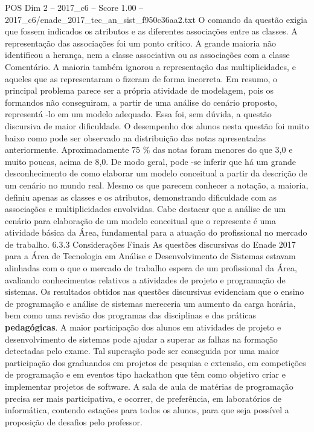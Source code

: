 \begin{textsample}{POS Dim 2 – 2017\_c6 – Score 1.00 – 2017\_c6/enade\_2017\_tec\_an\_sist\_f950c36aa2.txt}
O comando da questão exigia que fossem indicados os atributos e as diferentes associações entre as classes.
A representação das associações foi um ponto crítico.
A grande maioria não identificou a herança, nem a classe associativa ou as associações com a classe Comentário.
A maioria também ignorou a representação das multiplicidades, e aqueles que as representaram o fizeram de forma incorreta.
Em resumo, o principal problema parece ser a própria atividade de modelagem, pois os formandos não conseguiram, a partir de uma análise do cenário proposto, representá -lo em um modelo adequado.
Essa foi, sem dúvida, a questão discursiva de maior dificuldade.
O desempenho dos alunos nesta questão foi muito baixo como pode ser observado na distribuição das notas apresentadas anteriormente.
Aproximadamente 75 \% das notas foram menores do que 3,0 e muito poucas, acima de 8,0.
De modo geral, pode -se inferir que há um grande desconhecimento de como elaborar um modelo conceitual a partir da descrição de um cenário no mundo real.
Mesmo os que parecem conhecer a notação, a maioria, definiu apenas as classes e os atributos, demonstrando dificuldade com as associações e multiplicidades envolvidas.
Cabe destacar que a análise de um cenário para elaboração de um modelo conceitual que o represente é uma atividade básica da Área, fundamental para a atuação do profissional no mercado de trabalho. 6.3.3 Considerações Finais As questões discursivas do Enade 2017 para a Área de Tecnologia em Análise e Desenvolvimento de Sistemas estavam alinhadas com o que o mercado de trabalho espera de um profissional da Área, avaliando conhecimentos relativos a atividades de projeto e programação de sistemas.
Os resultados obtidos nas questões discursivas evidenciam que o ensino de programação e análise de sistemas mereceria um aumento da carga horária, bem como uma revisão dos programas das disciplinas e das práticas \textbf{pedagógicas}.
A maior participação dos alunos em atividades de projeto e desenvolvimento de sistemas pode ajudar a superar as falhas na formação detectadas pelo exame.
Tal superação pode ser conseguida por uma maior participação dos graduandos em projetos de pesquisa e extensão, em competições de programação e em eventos tipo hackathon que têm como objetivo criar e implementar projetos de software.
A sala de aula de matérias de programação precisa ser mais participativa, e ocorrer, de preferência, em laboratórios de informática, contendo estações para todos os alunos, para que seja possível a proposição de desafios pelo professor.

\end{textsample}
